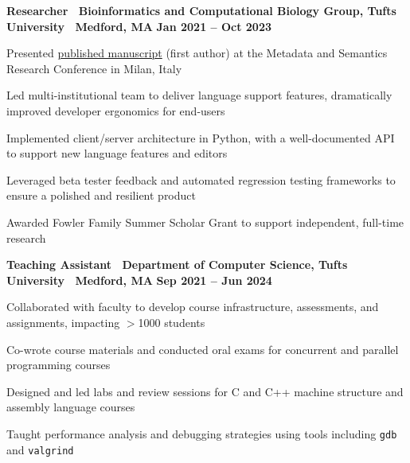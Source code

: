 \documentclass[10pt]{article}
\newenvironment{mylist}[1][]
{\itemize[nosep, wide=0pt, leftmargin=*, after=\strut]}
{\enditemize}
\begin{document}
\begin{minipage}[t]{\linewidth}
    \textbf{Researcher \textbar \ Bioinformatics and Computational Biology Group, Tufts University \textbar \ Medford, MA} \hfill \textbf{Jan 2021 -- Oct 2023}
    \begin{mylist}
    \item Presented \href{https://link.springer.com/chapter/10.1007/978-3-031-65990-4_25}{published manuscript} (first author) at the Metadata and Semantics Research Conference in Milan, Italy
        \item Led multi-institutional team to deliver language support features, dramatically improved developer ergonomics for end-users
        \item Implemented client/server architecture in Python, with a well-documented API to support new language features and editors
        \item Leveraged beta tester feedback and automated regression testing frameworks to ensure a polished and resilient product
        \item Awarded Fowler Family Summer Scholar Grant to support independent, full-time research
    \end{mylist}
\end{minipage}

\begin{minipage}[t]{\linewidth}
    \textbf{Teaching Assistant \textbar \ Department of Computer Science, Tufts University \textbar \ Medford, MA} \hfill \textbf{Sep 2021 -- Jun 2024}
    \begin{mylist} 
        \item Collaborated with faculty to develop course infrastructure, assessments, and assignments, impacting $>$1000 students
        \item Co-wrote course materials and conducted oral exams for concurrent and parallel programming courses
        \item Designed and led labs and review sessions for C and C++ machine structure and assembly language courses
        \item Taught performance analysis and debugging strategies using tools including \texttt{gdb} and \texttt{valgrind}
    \end{mylist}
\end{minipage}

\end{document}
